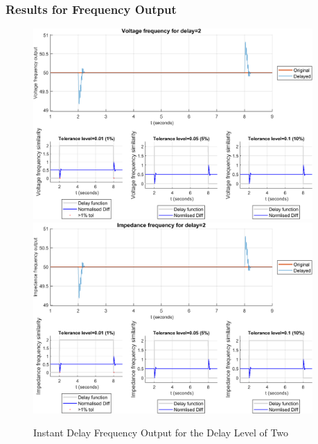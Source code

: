 \subsubsection{Results for Frequency Output}
\begin{figure}
    \caption{Instant Delay Frequency Output for the Delay Level of Two}
    \includegraphics[width=0.95\textwidth]{PMUsim-figures/DelayOf_2/Instant_vFrequency.png}    
    \label{fig:PMUsim_Two_vFrequency}
    \includegraphics[width=0.95\textwidth]{PMUsim-figures/DelayOf_2/Instant_iFrequency.png}    
    \label{fig:PMUsim_Two_Frequency}
        \begin{small}
     \end{small}
\end{figure}


